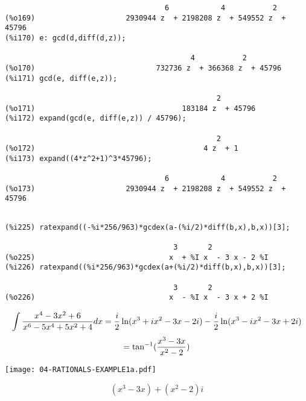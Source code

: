 {\begin{verbatim}
                                     6            4           2
(%o169)                     2930944 z  + 2198208 z  + 549552 z  + 45796
(%i170) e: gcd(d,diff(d,z));

                                           4           2
(%o170)                            732736 z  + 366368 z  + 45796
(%i171) gcd(e, diff(e,z));

                                                 2
(%o171)                                  183184 z  + 45796
(%i172) expand(gcd(e, diff(e,z)) / 45796);

                                                 2
(%o172)                                       4 z  + 1
(%i173) expand((4*z^2+1)^3*45796);

                                     6            4           2
(%o173)                     2930944 z  + 2198208 z  + 549552 z  + 45796


\end{verbatim}}

\vfill\eject

{\small\begin{verbatim}
(%i225) ratexpand((-%i*256/963)*gcdex(a-(%i/2)*diff(b,x),b,x))[3];

                                       3       2
(%o225)                               x  + %I x  - 3 x - 2 %I
(%i226) ratexpand((%i*256/963)*gcdex(a+(%i/2)*diff(b,x),b,x))[3];

                                       3       2
(%o226)                               x  - %I x  - 3 x + 2 %I
\end{verbatim}}

$$\int {{x^4-3x^2+6}\over{x^6-5x^4+5x^2+4}} dx =
   {i\over2}\ln(x^3+ix^2-3x-2i) - {i\over2}\ln(x^3-ix^2-3x+2i)$$
$$=\tan^{-1}({{x^3-3x}\over{x^2-2}})$$

\vfill

\begin{center}
\texttt{[image: 04-RATIONALS-EXAMPLE1a.pdf]}
\end{center}
$$(x^3-3x)+(x^2-2)i$$

